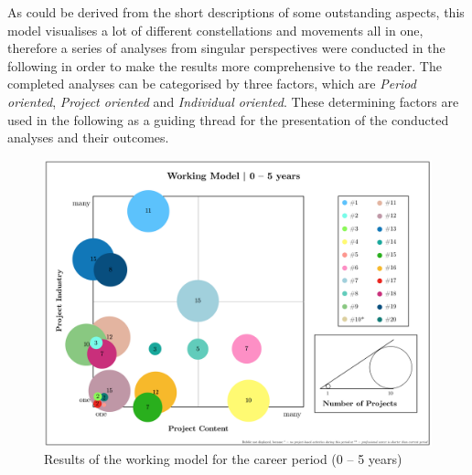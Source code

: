 As could be derived from the short descriptions of some outstanding aspects, this model visualises a lot of different constellations and movements all in one, therefore a series of analyses from singular perspectives were conducted in the following in order to make the results more comprehensive to the reader. The completed analyses can be categorised by three factors, which are \textit{Period oriented}, \textit{Project oriented} and \textit{Individual oriented}. These determining factors are used in the following as a guiding thread for the presentation of the conducted analyses and their outcomes. \\




\begin{figure}[!hbt]
    \captionsetup{font=small}
  \centering
  \includegraphics[width=0.75\columnwidth]{figures/WM_0005.png}
  \caption[Results of the working model: 0–5 years]{Results of the working model for the  career period (0 – 5 years)}
  \label{fig:WM_0005}
  
\vspace*{.6cm}


\end{figure}
